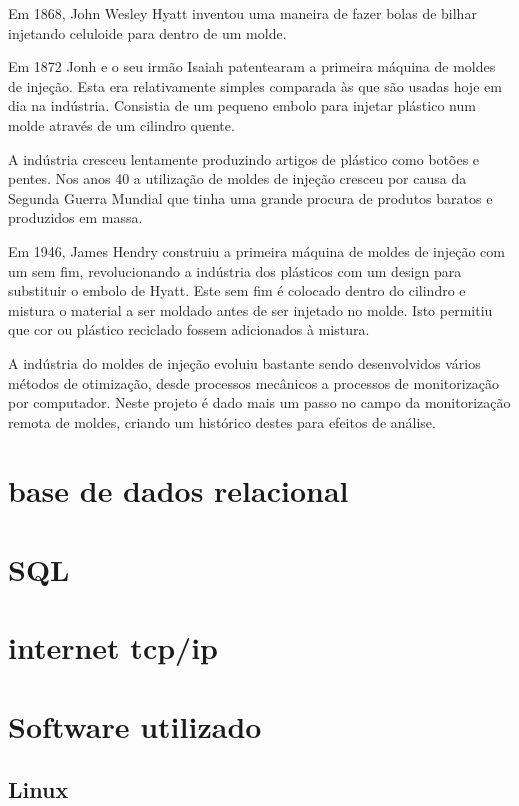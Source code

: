 \documentclass[11pt,twoside,a4paper]{report}
\begin{document}
Em 1868, John Wesley Hyatt inventou uma maneira de fazer bolas de bilhar injetando celuloide para dentro de um molde\cite{historia,patente1868}.\par
Em 1872 Jonh e o seu irmão Isaiah patentearam a primeira máquina de moldes de injeção. Esta era relativamente simples comparada às que são usadas hoje em dia na indústria. Consistia de um pequeno embolo para injetar plástico num molde através de um cilindro quente\cite{historia,patente1872}.\par
A indústria cresceu lentamente produzindo artigos de plástico como botões e pentes. Nos anos 40 a utilização de moldes de injeção cresceu por causa da Segunda Guerra Mundial que tinha uma grande procura de produtos baratos e produzidos em massa\cite{historia}.\par
Em 1946, James Hendry construiu a primeira máquina de moldes de injeção com um sem fim, revolucionando a indústria dos plásticos com um design para substituir o embolo de Hyatt. Este sem fim é colocado dentro do cilindro e mistura o material a ser moldado antes de ser injetado no molde. Isto permitiu que cor ou plástico reciclado fossem adicionados à mistura\cite{historia,patente1946}.\par
A indústria do moldes de injeção evoluiu bastante sendo desenvolvidos vários métodos de otimização, desde processos mecânicos a processos de monitorização por computador. Neste projeto é dado mais um passo no campo da monitorização remota de moldes, criando um histórico destes para efeitos de análise.\par


\section{base de dados relacional}

\section{SQL}

\section{internet tcp/ip}

\section{Software utilizado}
\subsection{Linux}
\end{document}
